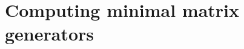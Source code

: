 \documentclass[12pt]{article}
\newcommand{\storeArg}{} %
\newcommand{\NN}{\mathbb{Z}_{\ge 0}} %
\newcommand{\var}{X} %
\newcommand{\field}{\mathbb{K}} %
\newcommand{\polRing}{\field[\var]} %
\newcommand{\Pox}{[\mkern-3mu[ \var ]\mkern-3.2mu]}
\newcommand{\psRing}{\field\Pox}
\newcommand{\matSpace}[1][\rdim]{\renewcommand\storeArg{#1}\matSpaceAux} %
\newcommand{\matSpaceAux}[1][\storeArg]{\field^{\storeArg \times #1}} %
\newcommand{\polMatSpace}[1][\rdim]{\renewcommand\storeArg{#1}\polMatSpaceAux} %
\newcommand{\polMatSpaceAux}[1][\storeArg]{\polRing^{\storeArg \times #1}} %
\newcommand{\psMatSpace}[1][\rdim]{\renewcommand\storeArg{#1}\psMatSpaceAux} %
\newcommand{\psMatSpaceAux}[1][\storeArg]{\psRing^{\storeArg \times #1}} %
\newcommand{\mat}[1]{\mathbf{\MakeUppercase{#1}}} %
\newcommand{\col}[1]{\mathbf{\MakeLowercase{#1}}} %
\newcommand{\rdim}{m} %
\newcommand{\cdim}{n} %
\newcommand{\seqelt}[1]{S_{#1}} %
\newcommand{\seq}{\mathcal{S}} %
\newcommand{\seqpm}{\mat{S}} %
\newcommand{\rel}{\col{p}} %
\newcommand{\relSpace}{\polMatSpace[1][\rdim]} %
\begin{document}
%
%
%

\section{Computing minimal matrix generators}
\label{sec:computing_matrix_generators}
\end{document}
